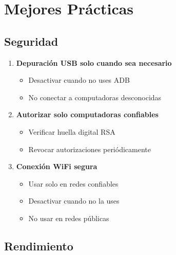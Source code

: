 \documentclass[
  doc,
  floatsintext,
  longtable,
  a4paper,
  nolmodern,
  notxfonts,
  notimes,
  12pt,
  colorlinks=true,linkcolor=blue,citecolor=blue,urlcolor=blue]{apa7}
\providecommand{\tightlist}{%
  \setlength{\itemsep}{0pt}\setlength{\parskip}{0pt}}
\begin{document}
\section{Mejores Prácticas}\label{mejores-pruxe1cticas}

\subsection{Seguridad}\label{seguridad}

\begin{enumerate}
\def\labelenumi{\arabic{enumi}.}
\item
  \textbf{Depuración USB solo cuando sea necesario}

  \begin{itemize}
  \tightlist
  \item
    Desactivar cuando no uses ADB
  \item
    No conectar a computadoras desconocidas
  \end{itemize}
\item
  \textbf{Autorizar solo computadoras confiables}

  \begin{itemize}
  \tightlist
  \item
    Verificar huella digital RSA
  \item
    Revocar autorizaciones periódicamente
  \end{itemize}
\item
  \textbf{Conexión WiFi segura}

  \begin{itemize}
  \tightlist
  \item
    Usar solo en redes confiables
  \item
    Desactivar cuando no la uses
  \item
    No usar en redes públicas
  \end{itemize}
\end{enumerate}

\subsection{Rendimiento}\label{rendimiento}
\end{document}
